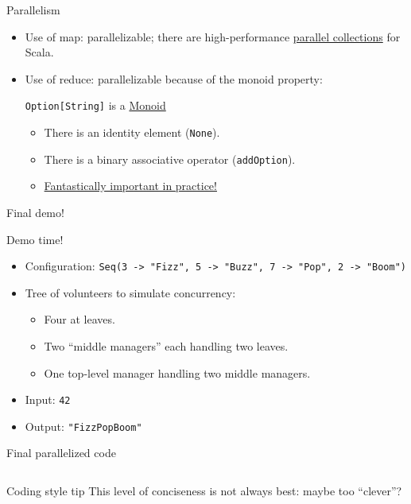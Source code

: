 \begin{frame}[fragile]{Parallelism}
  \begin{itemize}
  \item Use of \alert{map}: parallelizable; there are high-performance \href{http://scala-blitz.github.io/}{parallel collections} for Scala.
  \item Use of \alert{reduce}: parallelizable because of the monoid property:
  \begin{block}{\texttt{Option[String]} is a \href{http://en.wikipedia.org/wiki/Monoid}{Monoid}}
  \begin{itemize}
  \item There is an identity element (\texttt{None}).
  \item There is a binary associative operator (\texttt{addOption}).
  \item \href{http://www.michael-noll.com/blog/2013/12/02/twitter-algebird-monoid-monad-for-large-scala-data-analytics/}{Fantastically important in practice!}
  \end{itemize}
  \end{block}
  \end{itemize}
\end{frame}

\begin{frame}[fragile]{Final demo!}
  \begin{block}{Demo time!}
    \begin{itemize}
    \item Configuration: \texttt{Seq(3 -> "Fizz", 5 -> "Buzz", 7 -> "Pop", 2 -> "Boom")}
    \item Tree of volunteers to simulate concurrency:
      \begin{itemize}
      \item Four at leaves.
      \item Two ``middle managers'' each handling two leaves.
      \item One top-level manager handling two middle managers.
      \end{itemize}
    \item Input: \texttt{42}
    \item Output: \texttt{"FizzPopBoom"}
    \end{itemize}
  \end{block}
\end{frame}

\begin{frame}[fragile]{Final parallelized code}
  \inputminted[gobble=2]{scala}{FizzBuzz9.scala}

  \begin{block}{Coding style tip}
    This level of conciseness is not always best: maybe too ``clever''?
  \end{block}
\end{frame}

